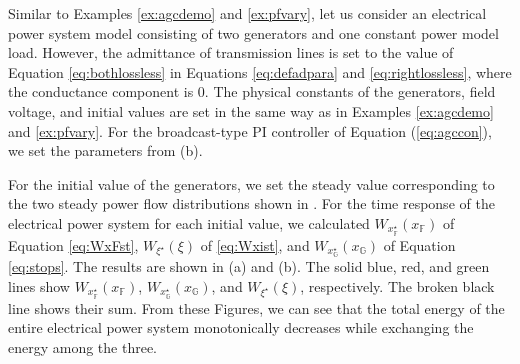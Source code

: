 \documentclass[tombow,dvipdfmx]{corona-a5-1.1}
\begin{document}
\begin{例}\label{ex:nonlinene}
Similar to Examples \ref{ex:agcdemo} and \ref{ex:pfvary}, let us consider an electrical power system model consisting of two generators and one constant power model load.
However, the admittance of transmission lines is set to the value of Equation \ref{eq:bothlossless} in Equations \ref{eq:defadpara} and \ref{eq:rightlossless}, where the conductance component is 0.
The physical constants of the generators, field voltage, and initial values are set in the same way as in Examples \ref{ex:agcdemo} and \ref{ex:pfvary}.
For the broadcast-type PI controller of Equation (\ref{eq:agccon}), we set the parameters from  (b).


For the initial value of the generators, we set the steady value corresponding to the two steady power flow distributions shown in .
For the time response of the electrical power system for each initial value, we calculated $W_{x^{\star}_{\mathds{F}}}(x_{\mathds{F}})$ of Equation \ref{eq:WxFst}, $W_{\xi^{\star}}(\xi)$ of \ref{eq:Wxist}, and $W_{x^{\star}_{\mathds{G}}}(x_{\mathds{G}})$ of Equation \ref{eq:stops}.
The results are shown in  (a) and (b).
The solid blue, red, and green lines show $W_{x^{\star}_{\mathds{F}}}(x_{\mathds{F}})$, $W_{x^{\star}_{\mathds{G}}}(x_{\mathds{G}})$, and $W_{\xi^{\star}}(\xi)$, respectively. The broken black line shows their sum. From these Figures, we can see that the total energy of the entire electrical power system monotonically decreases while exchanging the energy among the three.
\end{例}
\end{document}
